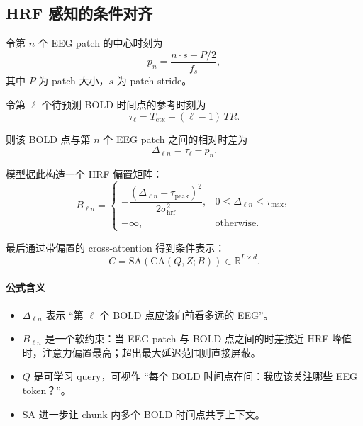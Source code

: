 \documentclass[11pt,a4paper]{ctexart}
\newcommand{\R}{\mathbb{R}}
\begin{document}
\subsection{HRF 感知的条件对齐}

令第 $n$ 个 EEG patch 的中心时刻为
\begin{equation}
p_n = \frac{n\cdot s + P/2}{f_s},
\end{equation}
其中 $P$ 为 patch 大小，$s$ 为 patch stride。

令第 $\ell$ 个待预测 BOLD 时间点的参考时刻为
\begin{equation}
\tau_\ell = T_{\mathrm{ctx}} + (\ell-1)\,TR.
\end{equation}

则该 BOLD 点与第 $n$ 个 EEG patch 之间的相对时差为
\begin{equation}
\Delta_{\ell n} = \tau_\ell - p_n.
\end{equation}

模型据此构造一个 HRF 偏置矩阵：
\begin{equation}
B_{\ell n} =
\begin{cases}
-\dfrac{(\Delta_{\ell n} - \tau_{\mathrm{peak}})^2}{2\sigma_{\mathrm{hrf}}^2}, & 0 \le \Delta_{\ell n} \le \tau_{\max}, \\
-\infty, & \text{otherwise.}
\end{cases}
\end{equation}

最后通过带偏置的 cross-attention 得到条件表示：
\begin{equation}
C = \mathrm{SA}\!\left(\mathrm{CA}(Q, Z; B)\right)
\in \R^{L \times d}.
\end{equation}

\paragraph{公式含义}
\begin{itemize}
  \item $\Delta_{\ell n}$ 表示 ``第 $\ell$ 个 BOLD 点应该向前看多远的 EEG''。
  \item $B_{\ell n}$ 是一个软约束：当 EEG patch 与 BOLD 点之间的时差接近 HRF 峰值时，注意力偏置最高；超出最大延迟范围则直接屏蔽。
  \item $Q$ 是可学习 query，可视作 ``每个 BOLD 时间点在问：我应该关注哪些 EEG token？''。
  \item $\mathrm{SA}$ 进一步让 chunk 内多个 BOLD 时间点共享上下文。
\end{itemize}
\end{document}

